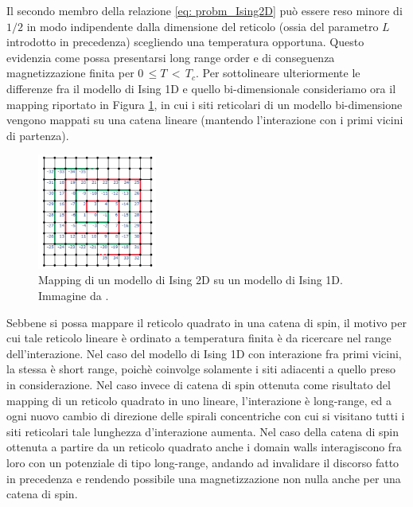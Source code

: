 Il secondo membro della relazione \eqref{eq: probm_Ising2D} può essere reso minore di $1/2$ in modo indipendente dalla dimensione del reticolo 
(ossia del parametro $L$ introdotto in precedenza) scegliendo una temperatura opportuna. Questo evidenzia come possa 
presentarsi long range order e di conseguenza magnetizzazione finita per $0\,\leq T\,<\,T_c$. Per sottolineare ulteriormente le 
differenze fra il modello di Ising 1D e quello bi-dimensionale consideriamo ora il mapping riportato in Figura \ref{fig: map_2to1_Ising}, 
in cui i siti reticolari di un modello bi-dimensione vengono mappati su una catena lineare (mantendo l'interazione con i primi 
vicini di partenza).

\begin{figure}[H]
    \centering
    \includegraphics[width=0.35\textwidth]{Immagini/map_2to1_Ising.png}
    \caption{Mapping di un modello di Ising 2D su un modello di Ising 1D. Immagine da \cite{galliFSA}.}
    \label{fig: map_2to1_Ising}
\end{figure}

Sebbene si possa mappare il reticolo quadrato in una catena di spin, il motivo per cui tale reticolo lineare è ordinato a temperatura 
finita è da ricercare nel range dell'interazione. Nel caso del modello di Ising 1D con interazione fra primi vicini, la stessa è short 
range, poichè coinvolge solamente i siti adiacenti a quello preso in considerazione. Nel caso invece di catena di spin ottenuta come 
risultato del mapping di un reticolo quadrato in uno lineare, l'interazione è long-range, ed a ogni nuovo cambio di direzione delle 
spirali concentriche con cui si visitano tutti i siti reticolari tale lunghezza d'interazione aumenta. Nel caso della catena di 
spin ottenuta a partire da un reticolo quadrato anche i domain walls interagiscono fra loro con un potenziale di tipo long-range, andando 
ad invalidare il discorso fatto in precedenza e rendendo possibile una magnetizzazione non nulla anche per una catena di spin. 






